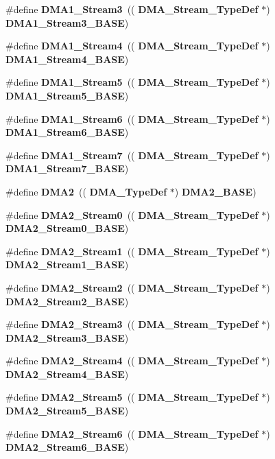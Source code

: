 \begin{DoxyCompactItemize}
\item 
\#define \textbf{ D\+M\+A1\+\_\+\+Stream3}~((\textbf{ D\+M\+A\+\_\+\+Stream\+\_\+\+Type\+Def} $\ast$) \textbf{ D\+M\+A1\+\_\+\+Stream3\+\_\+\+B\+A\+SE})
\item 
\#define \textbf{ D\+M\+A1\+\_\+\+Stream4}~((\textbf{ D\+M\+A\+\_\+\+Stream\+\_\+\+Type\+Def} $\ast$) \textbf{ D\+M\+A1\+\_\+\+Stream4\+\_\+\+B\+A\+SE})
\item 
\#define \textbf{ D\+M\+A1\+\_\+\+Stream5}~((\textbf{ D\+M\+A\+\_\+\+Stream\+\_\+\+Type\+Def} $\ast$) \textbf{ D\+M\+A1\+\_\+\+Stream5\+\_\+\+B\+A\+SE})
\item 
\#define \textbf{ D\+M\+A1\+\_\+\+Stream6}~((\textbf{ D\+M\+A\+\_\+\+Stream\+\_\+\+Type\+Def} $\ast$) \textbf{ D\+M\+A1\+\_\+\+Stream6\+\_\+\+B\+A\+SE})
\item 
\#define \textbf{ D\+M\+A1\+\_\+\+Stream7}~((\textbf{ D\+M\+A\+\_\+\+Stream\+\_\+\+Type\+Def} $\ast$) \textbf{ D\+M\+A1\+\_\+\+Stream7\+\_\+\+B\+A\+SE})
\item 
\#define \textbf{ D\+M\+A2}~((\textbf{ D\+M\+A\+\_\+\+Type\+Def} $\ast$) \textbf{ D\+M\+A2\+\_\+\+B\+A\+SE})
\item 
\#define \textbf{ D\+M\+A2\+\_\+\+Stream0}~((\textbf{ D\+M\+A\+\_\+\+Stream\+\_\+\+Type\+Def} $\ast$) \textbf{ D\+M\+A2\+\_\+\+Stream0\+\_\+\+B\+A\+SE})
\item 
\#define \textbf{ D\+M\+A2\+\_\+\+Stream1}~((\textbf{ D\+M\+A\+\_\+\+Stream\+\_\+\+Type\+Def} $\ast$) \textbf{ D\+M\+A2\+\_\+\+Stream1\+\_\+\+B\+A\+SE})
\item 
\#define \textbf{ D\+M\+A2\+\_\+\+Stream2}~((\textbf{ D\+M\+A\+\_\+\+Stream\+\_\+\+Type\+Def} $\ast$) \textbf{ D\+M\+A2\+\_\+\+Stream2\+\_\+\+B\+A\+SE})
\item 
\#define \textbf{ D\+M\+A2\+\_\+\+Stream3}~((\textbf{ D\+M\+A\+\_\+\+Stream\+\_\+\+Type\+Def} $\ast$) \textbf{ D\+M\+A2\+\_\+\+Stream3\+\_\+\+B\+A\+SE})
\item 
\#define \textbf{ D\+M\+A2\+\_\+\+Stream4}~((\textbf{ D\+M\+A\+\_\+\+Stream\+\_\+\+Type\+Def} $\ast$) \textbf{ D\+M\+A2\+\_\+\+Stream4\+\_\+\+B\+A\+SE})
\item 
\#define \textbf{ D\+M\+A2\+\_\+\+Stream5}~((\textbf{ D\+M\+A\+\_\+\+Stream\+\_\+\+Type\+Def} $\ast$) \textbf{ D\+M\+A2\+\_\+\+Stream5\+\_\+\+B\+A\+SE})
\item 
\#define \textbf{ D\+M\+A2\+\_\+\+Stream6}~((\textbf{ D\+M\+A\+\_\+\+Stream\+\_\+\+Type\+Def} $\ast$) \textbf{ D\+M\+A2\+\_\+\+Stream6\+\_\+\+B\+A\+SE})
\item 

\end{DoxyCompactItemize}
